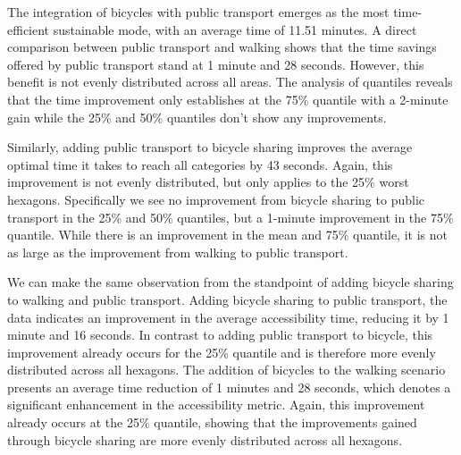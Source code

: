 The integration of bicycles with public transport emerges as the most time-efficient sustainable mode, with an average time of 11.51 minutes. 
A direct comparison between public transport and walking shows that the time savings offered by public transport stand at 1 minute and 28 seconds. 
However, this benefit is not evenly distributed across all areas.
The analysis of quantiles reveals that the time improvement only establishes at the 75\% quantile with a 2-minute gain while the 25\% and 50\% quantiles don't show any improvements.

Similarly, adding public transport to bicycle sharing improves the average optimal time it takes to reach all categories by 43 seconds.
Again, this improvement is not evenly distributed, but only applies to the 25\% worst hexagons.
Specifically we see no improvement from bicycle sharing to public transport in the 25\% and 50\% quantiles, but a 1-minute improvement in the 75\% quantile.
While there is an improvement in the mean and 75\% quantile, it is not as large as the improvement from walking to public transport.

We can make the same observation from the standpoint of adding bicycle sharing to walking and public transport.
Adding bicycle sharing to public transport, the data indicates an improvement in the average accessibility time, reducing it by 1 minute and 16 seconds.
In contrast to adding public transport to bicycle, this improvement already occurs for the 25\% quantile and is therefore more evenly distributed across all hexagons.
The addition of bicycles to the walking scenario presents an average time reduction of 1 minutes and 28 seconds, which denotes a significant enhancement in the accessibility metric. 
Again, this improvement already occurs at the 25\% quantile, showing that the improvements gained through bicycle sharing are more evenly distributed across all hexagons.

